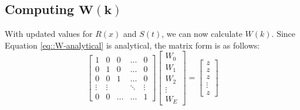 \documentclass{article}
\begin{document}
\subsection{Computing $\mathbf{W(k)}$}

With updated values for $R(x)$ and $S(t)$, we can now calculate $W(k)$. Since Equation \ref{eq::W-analytical} is analytical, the matrix form is as follows:
\begin{equation}
\begin{bmatrix}
1 & 0 & 0 & \dots & 0 \\
0 & 1 & 0 & \dots & 0 \\
0 & 0 & 1 & \dots & 0 \\
\vdots & \vdots &  & \ddots & \vdots\\
0 & 0 &  \dots  &\dots & 1
\end{bmatrix}
\begin{bmatrix}
W_0 \\ W_1 \\ W_2 \\ \vdots \\ W_E
\end{bmatrix}
= \begin{bmatrix}
z \\ z \\ z \\ \vdots  \\ z
\end{bmatrix}
\end{equation}
\end{document}
